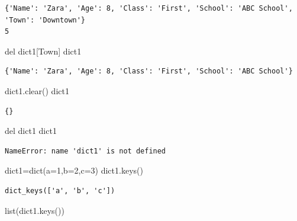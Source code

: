 \documentclass[
  letterpaper,
  DIV=11,
  numbers=noendperiod]{scrreprt}
\newenvironment{Shaded}{\begin{snugshade}}{\end{snugshade}}
\newcommand{\BuiltInTok}[1]{\textcolor[rgb]{0.00,0.23,0.31}{#1}}
\newcommand{\DecValTok}[1]{\textcolor[rgb]{0.68,0.00,0.00}{#1}}
\newcommand{\KeywordTok}[1]{\textcolor[rgb]{0.00,0.23,0.31}{#1}}
\newcommand{\NormalTok}[1]{\textcolor[rgb]{0.00,0.23,0.31}{#1}}
\newcommand{\OperatorTok}[1]{\textcolor[rgb]{0.37,0.37,0.37}{#1}}
\newcommand{\StringTok}[1]{\textcolor[rgb]{0.13,0.47,0.30}{#1}}
\begin{document}
\begin{verbatim}
{'Name': 'Zara', 'Age': 8, 'Class': 'First', 'School': 'ABC School', 'Town': 'Downtown'}
5
\end{verbatim}

\begin{Shaded}
\begin{Highlighting}[]
\KeywordTok{del}\NormalTok{ dict1[}\StringTok{\textquotesingle{}Town\textquotesingle{}}\NormalTok{]}
\NormalTok{dict1}
\end{Highlighting}
\end{Shaded}

\begin{verbatim}
{'Name': 'Zara', 'Age': 8, 'Class': 'First', 'School': 'ABC School'}
\end{verbatim}

\begin{Shaded}
\begin{Highlighting}[]
\NormalTok{dict1.clear()}
\NormalTok{dict1}
\end{Highlighting}
\end{Shaded}

\begin{verbatim}
{}
\end{verbatim}

\begin{Shaded}
\begin{Highlighting}[]
\KeywordTok{del}\NormalTok{ dict1}
\NormalTok{dict1}
\end{Highlighting}
\end{Shaded}

\begin{verbatim}
NameError: name 'dict1' is not defined
\end{verbatim}

\begin{Shaded}
\begin{Highlighting}[]
\NormalTok{dict1}\OperatorTok{=}\BuiltInTok{dict}\NormalTok{(a}\OperatorTok{=}\DecValTok{1}\NormalTok{,b}\OperatorTok{=}\DecValTok{2}\NormalTok{,c}\OperatorTok{=}\DecValTok{3}\NormalTok{)}
\NormalTok{dict1.keys()}
\end{Highlighting}
\end{Shaded}

\begin{verbatim}
dict_keys(['a', 'b', 'c'])
\end{verbatim}

\begin{Shaded}
\begin{Highlighting}[]
\BuiltInTok{list}\NormalTok{(dict1.keys())}
\end{Highlighting}
\end{Shaded}
\end{document}
